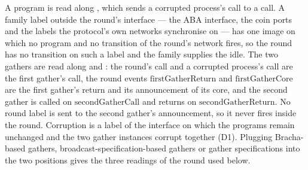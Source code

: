 \begin{definition}
  A program is read along , which sends a corrupted process's call to a call.
  A family label outside the round's interface --- the ABA interface, the coin ports and the labels the protocol's own networks synchronise on --- has one image on which no program and no transition of the round's network fires, so the round has no transition on such a label and the family supplies the idle.
  The two gathers are read along  and : the round's call and a corrupted process's call are the first gather's call, the round events $\mathrm{firstGatherReturn}$ and $\mathrm{firstGatherCore}$ are the first gather's return and its announcement of its core, and the second gather is called on $\mathrm{secondGatherCall}$ and returns on $\mathrm{secondGatherReturn}$.
  No round label is sent to the second gather's announcement, so it never fires inside the round.
  Corruption is a label of the interface on which the programs remain unchanged and the two gather instances corrupt together (D1).
  Plugging Bracha-based gathers, broadcast-specification-based gathers or gather specifications into the two positions gives the three readings of the round used below.
\end{definition}
